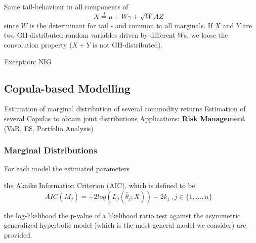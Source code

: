 	Same tail-behaviour in all components of $$X\stackrel{d}{=}\mu+W\gamma+\sqrt{W}AZ$$
	since $W$ is the determinant for tail - and common to all marginals.  If $X$ and $Y$ are two GH-distributed random
	variables driven by different $W$s, we loose the convolution property ($X+Y$ is not GH-distributed).  
	
	Exception: NIG


\subsection{Copula-based Modelling}
Estimation of marginal  distribution of several commodity
returns  Estimation of several Copulas to obtain joint
distributions  Applications: \textbf{Risk Management} (VaR,
ES, Portfolio Analysis)


\subsubsection{Marginal Distributions}
For each model
	the estimated parameters  
	
	the Akaike Information Criterion (AIC), which is defined to be \[AIC(M_j)=-2log(L_j(\hat{\theta}_j; X))+2k_j\ ,j\in\{1,\ldots,n\}\]
	
	the log-likelihood  the p-value of a likelihood ratio test against the asymmetric generalized hyperbolic model (which is the most general model we consider)
are provided.


